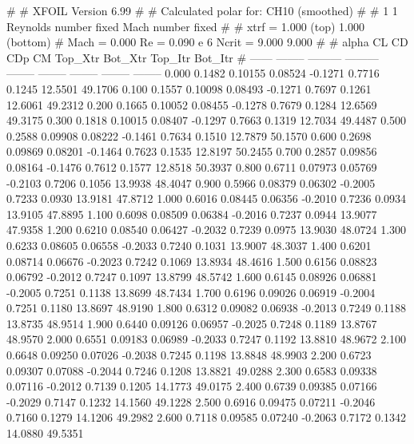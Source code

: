 #  
#       XFOIL         Version 6.99
#  
# Calculated polar for: CH10 (smoothed)                                 
#  
# 1 1 Reynolds number fixed          Mach number fixed         
#  
# xtrf =   1.000 (top)        1.000 (bottom)  
# Mach =   0.000     Re =     0.090 e 6     Ncrit =   9.000  9.000
#  
#   alpha    CL        CD       CDp       CM     Top_Xtr  Bot_Xtr  Top_Itr  Bot_Itr
#  ------ -------- --------- --------- -------- -------- -------- -------- --------
   0.000   0.1482   0.10155   0.08524  -0.1271   0.7716   0.1245  12.5501  49.1706
   0.100   0.1557   0.10098   0.08493  -0.1271   0.7697   0.1261  12.6061  49.2312
   0.200   0.1665   0.10052   0.08455  -0.1278   0.7679   0.1284  12.6569  49.3175
   0.300   0.1818   0.10015   0.08407  -0.1297   0.7663   0.1319  12.7034  49.4487
   0.500   0.2588   0.09908   0.08222  -0.1461   0.7634   0.1510  12.7879  50.1570
   0.600   0.2698   0.09869   0.08201  -0.1464   0.7623   0.1535  12.8197  50.2455
   0.700   0.2857   0.09856   0.08164  -0.1476   0.7612   0.1577  12.8518  50.3937
   0.800   0.6711   0.07973   0.05769  -0.2103   0.7206   0.1056  13.9938  48.4047
   0.900   0.5966   0.08379   0.06302  -0.2005   0.7233   0.0930  13.9181  47.8712
   1.000   0.6016   0.08445   0.06356  -0.2010   0.7236   0.0934  13.9105  47.8895
   1.100   0.6098   0.08509   0.06384  -0.2016   0.7237   0.0944  13.9077  47.9358
   1.200   0.6210   0.08540   0.06427  -0.2032   0.7239   0.0975  13.9030  48.0724
   1.300   0.6233   0.08605   0.06558  -0.2033   0.7240   0.1031  13.9007  48.3037
   1.400   0.6201   0.08714   0.06676  -0.2023   0.7242   0.1069  13.8934  48.4616
   1.500   0.6156   0.08823   0.06792  -0.2012   0.7247   0.1097  13.8799  48.5742
   1.600   0.6145   0.08926   0.06881  -0.2005   0.7251   0.1138  13.8699  48.7434
   1.700   0.6196   0.09026   0.06919  -0.2004   0.7251   0.1180  13.8697  48.9190
   1.800   0.6312   0.09082   0.06938  -0.2013   0.7249   0.1188  13.8735  48.9514
   1.900   0.6440   0.09126   0.06957  -0.2025   0.7248   0.1189  13.8767  48.9570
   2.000   0.6551   0.09183   0.06989  -0.2033   0.7247   0.1192  13.8810  48.9672
   2.100   0.6648   0.09250   0.07026  -0.2038   0.7245   0.1198  13.8848  48.9903
   2.200   0.6723   0.09307   0.07088  -0.2044   0.7246   0.1208  13.8821  49.0288
   2.300   0.6583   0.09338   0.07116  -0.2012   0.7139   0.1205  14.1773  49.0175
   2.400   0.6739   0.09385   0.07166  -0.2029   0.7147   0.1232  14.1560  49.1228
   2.500   0.6916   0.09475   0.07211  -0.2046   0.7160   0.1279  14.1206  49.2982
   2.600   0.7118   0.09585   0.07240  -0.2063   0.7172   0.1342  14.0880  49.5351
